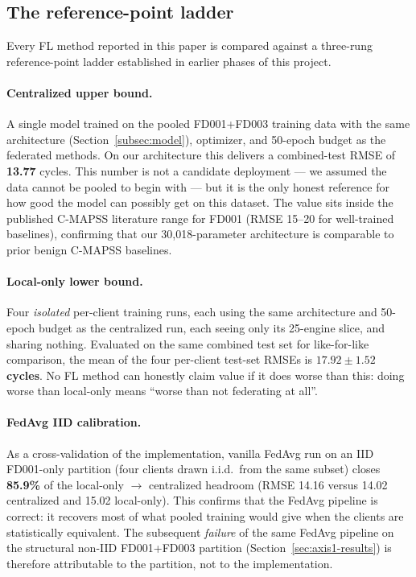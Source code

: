 \documentclass[preprint,12pt,authoryear]{elsarticle}
\begin{document}
\subsection{The reference-point ladder}
\label{subsec:refladder}

Every FL method reported in this paper is compared against a
three-rung reference-point ladder established in earlier phases of
this project.

\paragraph{Centralized upper bound.}
A single model trained on the pooled FD001+FD003 training data with
the same architecture (Section~\ref{subsec:model}), optimizer, and
50-epoch budget as the federated methods. On our architecture this
delivers a combined-test RMSE of \textbf{13.77} cycles. This
number is not a candidate deployment --- we assumed the data cannot
be pooled to begin with --- but it is the only honest reference for
how good the model can possibly get on this dataset. The value
sits inside the published C-MAPSS literature range for FD001 (RMSE
15--20 for well-trained baselines), confirming that our
30{,}018-parameter architecture is comparable to prior benign
C-MAPSS baselines.

\paragraph{Local-only lower bound.}
Four \emph{isolated} per-client training runs, each using the same
architecture and 50-epoch budget as the centralized run, each
seeing only its 25-engine slice, and sharing nothing. Evaluated on
the same combined test set for like-for-like comparison, the mean
of the four per-client test-set RMSEs is
\textbf{$17.92 \pm 1.52$ cycles}. No FL method can honestly claim
value if it does worse than this: doing worse than local-only means
``worse than not federating at all''.

\paragraph{FedAvg IID calibration.}
As a cross-validation of the implementation, vanilla FedAvg run on
an IID FD001-only partition (four clients drawn i.i.d.\ from the
same subset) closes \textbf{85.9\%} of the local-only $\to$
centralized headroom (RMSE 14.16 versus 14.02 centralized and 15.02
local-only). This confirms that the FedAvg pipeline is correct: it
recovers most of what pooled training would give when the clients
are statistically equivalent. The subsequent \emph{failure} of the
same FedAvg pipeline on the structural non-IID FD001+FD003
partition (Section~\ref{sec:axis1-results}) is therefore
attributable to the partition, not to the implementation.
\end{document}
